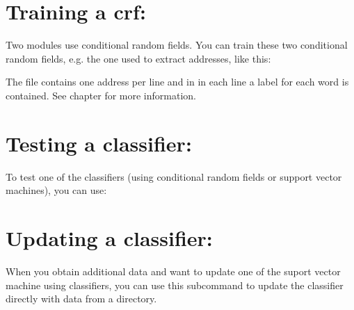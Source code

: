 \documentclass[letterpaper,10pt,english]{sphinxmanual}
\begin{document}
\section{Training a crf:}
\label{\detokenize{tutorial:training-a-crf}}
Two modules use conditional random fields. You can train these two
conditional random fields, e.g. the one used to extract addresses,
like this:

%
\begin{sphinxVerbatim}[commandchars=\\\{\}]
     
\end{sphinxVerbatim}

The file  contains one address per line and in
 in each line a label for each word is
contained. See chapter {\hyperref[\detokenize{training:training}]{}} for more information.


\section{Testing a classifier:}
\label{\detokenize{tutorial:testing-a-classifier}}
To test one of the classifiers (using conditional random fields or
support vector machines), you can use:

%
\begin{sphinxVerbatim}[commandchars=\\\{\}]
    
\end{sphinxVerbatim}


\section{Updating a classifier:}
\label{\detokenize{tutorial:updating-a-classifier}}
When you obtain additional data and want to update one of the suport
vector machine using classifiers, you can use this subcommand to
update the classifier directly with data from a directory.

%
\begin{sphinxVerbatim}[commandchars=\\\{\}]
    
\end{sphinxVerbatim}
\end{document}
